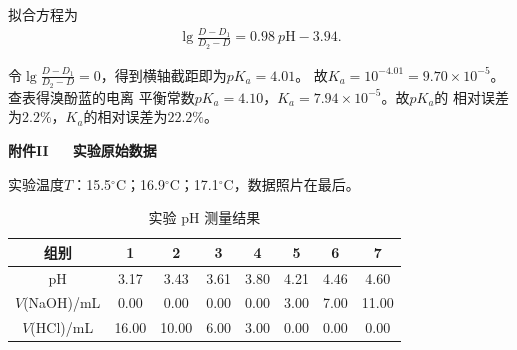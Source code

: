 \documentclass[12pt]{ctexart}
\numberwithin{equation}{section}
\begin{document}
拟合方程为
\begin{align}
    \lg\frac{D-D_1}{D_2-D}
        = 0.98 ~ p\mathrm{H} - 3.94. \tag{I.2}
\end{align}

令$\lg\frac{D-D_1}{D_2-D} = 0$，得到横轴截距即为$pK_a = 4.01$。
故$K_a = 10^{-4.01} = 9.70 \times 10^{-5}$。查表得溴酚蓝的电离
平衡常数$pK_a = 4.10$，$K_a = 7.94 \times 10^{-5}$。故$pK_a$的
相对误差为$2.2\%$，$K_a$的相对误差为$22.2\%$。

\begin{center}
    \Large\bfseries{附件II~~~实验原始数据}
\end{center}

实验温度$T$：15.5$^\circ$C；16.9$^\circ$C；17.1$^\circ$C，数据照片在最后。

\begin{longtable}{c|ccccccc}
    \caption{实验 pH 测量结果} \\
    \hline
    \hline
    组别 & 1 & 2 & 3 & 4 & 5 & 6 & 7 \\
    \hline
    pH & 3.17 & 3.43 & 3.61 & 3.80 & 4.21 & 4.46 & 4.60 \\
    \hline
    $V$(NaOH)/mL & 0.00 & 0.00 & 0.00 & 0.00 & 3.00 & 7.00 & 11.00 \\
    \hline
    $V$(HCl)/mL & 16.00 & 10.00 & 6.00 & 3.00 & 0.00 & 0.00 & 0.00 \\
    \hline
    \hline
\end{longtable}

\pagebreak
\end{document}
